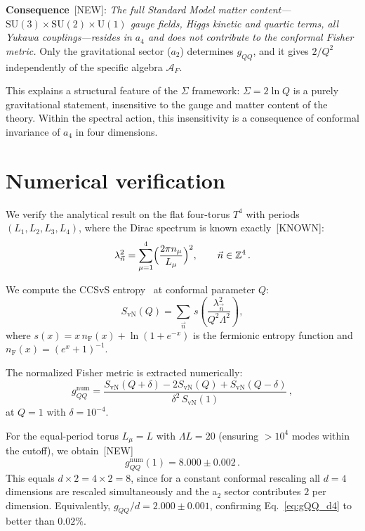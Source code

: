 \documentclass[prl,twocolumn,superscriptaddress,longbibliography]{revtex4-2}
\newcommand{\nF}{n_{\mathrm{F}}}
\newcommand{\SvN}{S_{\mathrm{vN}}}
\begin{document}
\smallskip
\noindent\textbf{Consequence}~[NEW]:
\emph{The full Standard Model matter content---$\mathrm{SU}(3) \times \mathrm{SU}(2) \times \mathrm{U}(1)$
gauge fields, Higgs kinetic and quartic terms,
all Yukawa couplings---resides in $a_4$ and
does not contribute to the conformal Fisher metric.}
Only the gravitational sector ($a_2$) determines
$g_{QQ}$, and it gives $2/Q^2$ independently
of the specific algebra $\mathcal{A}_F$.

This explains a structural feature of the $\Sigma$
framework:
$\Sigma = 2\ln Q$ is a purely gravitational
statement, insensitive to the gauge and matter
content of the theory.
Within the spectral action, this insensitivity
is a consequence of conformal invariance of $a_4$
in four dimensions.


\section{Numerical verification}
\label{sec:numerical}

We verify the analytical result on the
flat four-torus $T^4$ with periods
$(L_1, L_2, L_3, L_4)$, where the Dirac
spectrum is known exactly~[KNOWN]:
\begin{equation}
  \lambda_{\vec{n}}^2
  = \sum_{\mu=1}^{4}
  \Bigl(\frac{2\pi n_\mu}{L_\mu}\Bigr)^2,
  \qquad \vec{n} \in \mathbb{Z}^4\,.
\end{equation}

We compute the CCSvS entropy~\cite{CCSvS2018}
at conformal parameter $Q$:
\begin{equation}\label{eq:SvN_num}
  \SvN(Q) = \sum_{\vec{n}}\,
  s\!\left(\frac{\lambda_{\vec{n}}^2}{Q^2\Lambda^2}\right),
\end{equation}
where $s(x) = x\,\nF(x) + \ln(1+e^{-x})$ is
the fermionic entropy function and
$\nF(x) = (e^x + 1)^{-1}$.

The normalized Fisher metric is extracted
numerically:
\begin{equation}\label{eq:gQQ_num}
  g_{QQ}^{\mathrm{num}}
  = \frac{\SvN(Q+\delta) - 2\SvN(Q) + \SvN(Q-\delta)}
  {\delta^2\, \SvN(1)}\,,
\end{equation}
at $Q=1$ with $\delta = 10^{-4}$.

For the equal-period torus $L_\mu = L$ with
$\Lambda L = 20$ (ensuring $> 10^4$ modes
within the cutoff), we obtain~[NEW]
\begin{equation}\label{eq:numerical_result}
  g_{QQ}^{\mathrm{num}}(1) = 8.000 \pm 0.002\,.
\end{equation}
This equals $d \times 2 = 4 \times 2 = 8$, since
for a constant conformal rescaling all $d = 4$
dimensions are rescaled simultaneously and the
a$_2$ sector contributes $2$ per dimension.
Equivalently, $g_{QQ}/d = 2.000 \pm 0.001$,
confirming Eq.~\eqref{eq:gQQ_d4} to better
than $0.02\%$.
\end{document}
